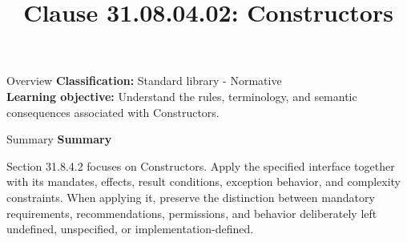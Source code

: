 \documentclass[10pt,letterpaper]{article}
\title{Clause 31.08.04.02: Constructors}
\author{}
\date{}
\begin{document}
\maketitle
\begin{CornellOverviewBox}{Overview}
\textbf{Classification:} Standard library - Normative\\[2pt]
\textbf{Learning objective:} Understand the rules, terminology, and semantic consequences associated with Constructors.
\end{CornellOverviewBox}\begin{CornellSummaryBox}{Summary}
{\sffamily\bfseries\color{Accent} Summary}\par\vspace{3pt}Section 31.8.4.2 focuses on Constructors. Apply the specified interface together with its mandates, effects, result conditions, exception behavior, and complexity constraints. When applying it, preserve the distinction between mandatory requirements, recommendations, permissions, and behavior deliberately left undefined, unspecified, or implementation-defined.
\end{CornellSummaryBox}
\end{document}
